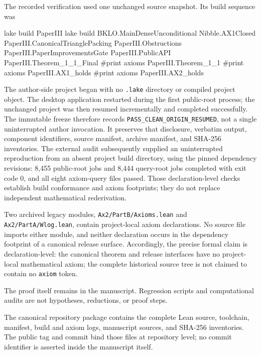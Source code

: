 \documentclass[
  american,
  11pt,
  a4paper,
]{article}
\newenvironment{Shaded}{}{}
\newcommand{\NormalTok}[1]{#1}
\begin{document}
The recorded verification used one unchanged source snapshot. Its build sequence was

\begin{Shaded}
\begin{Highlighting}[]
\NormalTok{lake build PaperIII}
\NormalTok{lake build BKLO.MainDenseUnconditional Nibble.AX1Closed PaperIII.CanonicalTrianglePacking PaperIII.Obstructions PaperIII.PaperImprovementsGate PaperIII.PublicAPI PaperIII.Theorem\_1\_1\_Final}
\NormalTok{\#print axioms PaperIII.Theorem\_1\_1}
\NormalTok{\#print axioms PaperIII.AX1\_holds}
\NormalTok{\#print axioms PaperIII.AX2\_holds}
\end{Highlighting}
\end{Shaded}

The author-side project began with no \texttt{.lake} directory or compiled project object. The desktop application restarted during the first public-root process; the unchanged project was then resumed incrementally and completed successfully. The immutable freeze therefore records \texttt{PASS\_CLEAN\_ORIGIN\_RESUMED}, not a single uninterrupted author invocation. It preserves that disclosure, verbatim output, component identifiers, source manifest, archive manifest, and SHA-256 inventories. The external audit subsequently supplied an uninterrupted reproduction from an absent project build directory, using the pinned dependency revisions: 8,455 public-root jobs and 8,444 query-root jobs completed with exit code 0, and all eight axiom-query files passed. Those declaration-level checks establish build conformance and axiom footprints; they do not replace independent mathematical rederivation.

Two archived legacy modules, \texttt{Ax2/PartB/Axioms.lean} and \texttt{Ax2/PartA/Wlog.lean}, contain project-local axiom declarations. No source file imports either module, and neither declaration occurs in the dependency footprint of a canonical release surface. Accordingly, the precise formal claim is declaration-level: the canonical theorem and release interfaces have no project-local mathematical axiom; the complete historical source tree is not claimed to contain no \texttt{axiom} token.

The proof itself remains in the manuscript. Regression scripts and computational audits are not hypotheses, reductions, or proof steps.

The canonical repository package contains the complete Lean source, toolchain, manifest, build and axiom logs, manuscript sources, and SHA-256 inventories. The public tag and commit bind those files at repository level; no commit identifier is asserted inside the manuscript itself.
\end{document}
